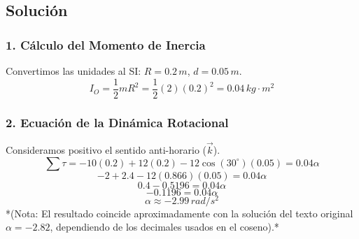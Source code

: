 \documentclass[12pt, a4paper]{article}
\begin{document}
\begin{center}
\end{center}

\subsection*{Solución}

\subsubsection*{1. Cálculo del Momento de Inercia}
Convertimos las unidades al SI: $R = 0.2 \, \si{m}$, $d = 0.05 \, \si{m}$.
$$ I_O = \frac{1}{2} m R^2 = \frac{1}{2} (2) (0.2)^2 = 0.04 \, \si{kg \cdot m^2} $$

\subsubsection*{2. Ecuación de la Dinámica Rotacional}
Consideramos positivo el sentido anti-horario ($\vec{k}$).
$$ \sum \tau = -10(0.2) + 12(0.2) - 12 \cos(30^\circ)(0.05) = 0.04 \alpha $$
$$ -2 + 2.4 - 12(0.866)(0.05) = 0.04 \alpha $$
$$ 0.4 - 0.5196 = 0.04 \alpha $$
$$ -0.1196 = 0.04 \alpha $$
$$ \alpha \approx -2.99 \, \si{rad/s^2} $$
*(Nota: El resultado coincide aproximadamente con la solución del texto original $\alpha = -2.82$, dependiendo de los decimales usados en el coseno).*
\end{document}
